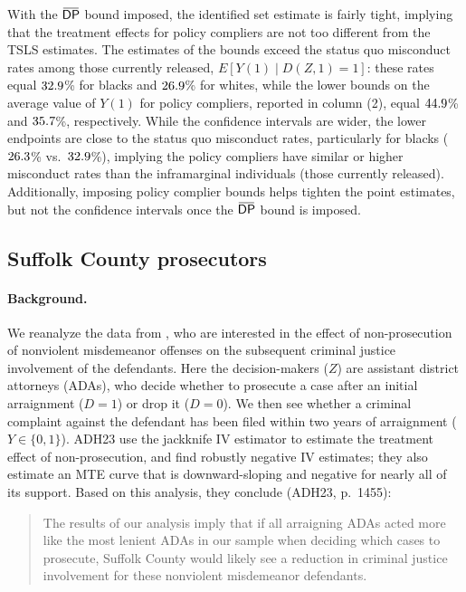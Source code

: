 \documentclass[12pt]{article}%
\theoremstyle{definition}
\newcommand\1{\operatorname{I}\indicatorfence}
\newcommand{\overbar}[1]{\mkern 1.5mu\overline{\mkern-1.5mu#1\mkern-1.5mu}%
  \mkern 1.5mu}%
\newcommand{\DP}{\mathsf{DP}}
\begin{document}
With the $\overbar{\DP}$ bound imposed, the identified set estimate is fairly tight, implying that the treatment effects
for policy compliers are not too different from the TSLS estimates. The estimates of the bounds exceed the
status quo misconduct rates among those currently released,
$E[Y(1)\mid D(Z,1)=1]$: these rates equal $32.9$\% for blacks and $26.9$\%
for whites, while the lower bounds on the average value of $Y(1)$ for policy
compliers, reported in column (2), equal $44.9$\% and $35.7$\%,
respectively. While the confidence intervals are wider, the lower endpoints are
close to the status quo misconduct rates, particularly for blacks ($26.3$\% vs.\ $32.9$\%), implying the
policy compliers have similar or higher misconduct rates than the inframarginal
individuals (those currently released). Additionally, imposing policy complier bounds helps tighten the point estimates, but not the confidence intervals
once the $\overbar{\DP}$ bound is imposed.

\subsection{Suffolk County prosecutors}\label{sec:suff-county-pros}

\paragraph{Background.} We reanalyze the data from \textcite[henceforth
AHD23]{adh23}, who are interested in the effect of non-prosecution of nonviolent
misdemeanor offenses on the subsequent criminal justice involvement of the
defendants. Here the decision-makers ($Z$) are assistant district attorneys
(ADAs), who decide whether to prosecute a case after an initial arraignment
($D=1$) or drop it ($D=0$). We then see whether a criminal complaint against
the defendant has been filed within two years of arraignment ($Y\in\{0,1\}$).
ADH23 use the jackknife IV estimator to estimate the treatment effect of
non-prosecution, and find robustly negative IV estimates; they also estimate an MTE curve that is downward-sloping and negative for nearly all of its support. Based on this
analysis, they conclude (ADH23, p.~1455):

\begin{footnotesize}
  \begin{quote}
    The results of our analysis imply that if all arraigning ADAs acted more
    like the most lenient ADAs in our sample when deciding which cases to
    prosecute, Suffolk County would likely see a reduction in criminal justice
    involvement for these nonviolent misdemeanor defendants.
  \end{quote}
\end{footnotesize}
\end{document}
